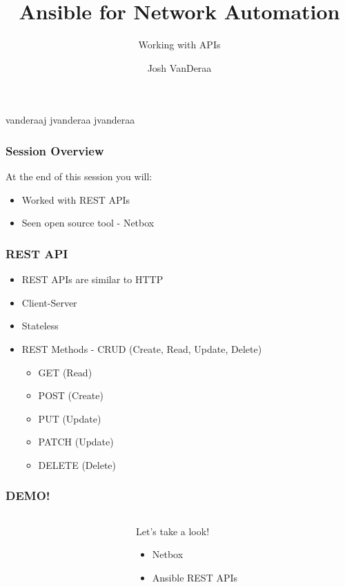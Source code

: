 \documentclass[aspectratio=169]{beamer}
\title{Ansible for Network Automation}
\subtitle{Working with APIs}
\date{}
\author{Josh VanDeraa}
\begin{document}
\begin{frame}
  \maketitle
  \footnotesize
  \faTwitter vanderaaj \hfill \faGithub jvanderaa \hfill \faSlack jvanderaa
\end{frame}

\begin{frame}
    \frametitle{Session Overview}
    At the end of this session you will:
    \begin{itemize}
      \item <2-> Worked with REST APIs
      \item <3-> Seen open source tool - Netbox
    \end{itemize}
  \end{frame}

  \begin{frame}[t]
    \frametitle{REST API}
      \begin{itemize}
        \item <2-> REST APIs are similar to HTTP 
        \item <3-> Client-Server
        \item <4-> Stateless
        \item <5-> REST Methods - CRUD (Create, Read, Update, Delete)
        \begin{itemize}
          \item <5-> GET (Read)
          \item <6-> POST (Create)
          \item <7-> PUT (Update)
          \item <8-> PATCH (Update)
          \item <9-> DELETE (Delete)
        \end{itemize}
      \end{itemize}
  \end{frame}

  \begin{frame}
    \frametitle{DEMO!}
    \begin{columns}
    \begin{column}{0.3\textwidth}
      \Huge
      \begin{center}
        \faDesktop 
        \hspace{.5cm}
        \faRocket     
      \end{center}
    \end{column}
    \begin{column}{0.7\textwidth}
      \huge 
        Let's take a look!
        \begin{itemize}
          \item Netbox
          \item Ansible REST APIs
        \end{itemize}
    \end{column}
    \end{columns}
  \end{frame}
\end{document}
